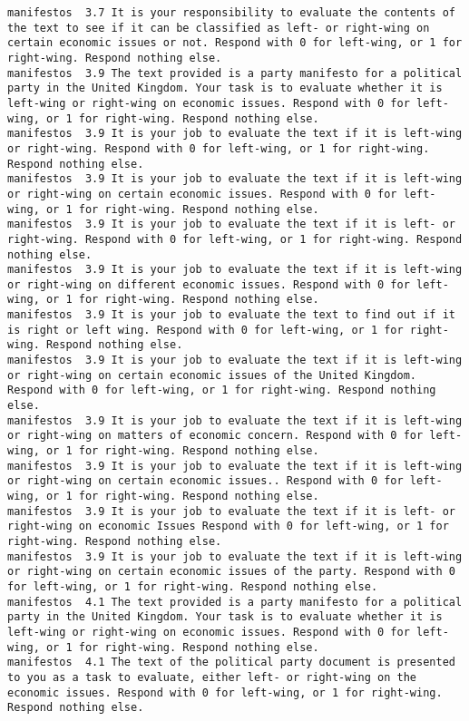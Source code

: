 \begin{lstlisting}[label=lst:promptvariants]
manifestos	3.7	It is your responsibility to evaluate the contents of the text to see if it can be classified as left- or right-wing on certain economic issues or not. Respond with 0 for left-wing, or 1 for right-wing. Respond nothing else.
manifestos	3.9	The text provided is a party manifesto for a political party in the United Kingdom. Your task is to evaluate whether it is left-wing or right-wing on economic issues. Respond with 0 for left-wing, or 1 for right-wing. Respond nothing else.
manifestos	3.9	It is your job to evaluate the text if it is left-wing or right-wing. Respond with 0 for left-wing, or 1 for right-wing. Respond nothing else.
manifestos	3.9	It is your job to evaluate the text if it is left-wing or right-wing on certain economic issues. Respond with 0 for left-wing, or 1 for right-wing. Respond nothing else.
manifestos	3.9	It is your job to evaluate the text if it is left- or right-wing. Respond with 0 for left-wing, or 1 for right-wing. Respond nothing else.
manifestos	3.9	It is your job to evaluate the text if it is left-wing or right-wing on different economic issues. Respond with 0 for left-wing, or 1 for right-wing. Respond nothing else.
manifestos	3.9	It is your job to evaluate the text to find out if it is right or left wing. Respond with 0 for left-wing, or 1 for right-wing. Respond nothing else.
manifestos	3.9	It is your job to evaluate the text if it is left-wing or right-wing on certain economic issues of the United Kingdom. Respond with 0 for left-wing, or 1 for right-wing. Respond nothing else.
manifestos	3.9	It is your job to evaluate the text if it is left-wing or right-wing on matters of economic concern. Respond with 0 for left-wing, or 1 for right-wing. Respond nothing else.
manifestos	3.9	It is your job to evaluate the text if it is left-wing or right-wing on certain economic issues.. Respond with 0 for left-wing, or 1 for right-wing. Respond nothing else.
manifestos	3.9	It is your job to evaluate the text if it is left- or right-wing on economic Issues Respond with 0 for left-wing, or 1 for right-wing. Respond nothing else.
manifestos	3.9	It is your job to evaluate the text if it is left-wing or right-wing on certain economic issues of the party. Respond with 0 for left-wing, or 1 for right-wing. Respond nothing else.
manifestos	4.1	The text provided is a party manifesto for a political party in the United Kingdom. Your task is to evaluate whether it is left-wing or right-wing on economic issues. Respond with 0 for left-wing, or 1 for right-wing. Respond nothing else.
manifestos	4.1	The text of the political party document is presented to you as a task to evaluate, either left- or right-wing on the economic issues. Respond with 0 for left-wing, or 1 for right-wing. Respond nothing else.

\end{lstlisting}
